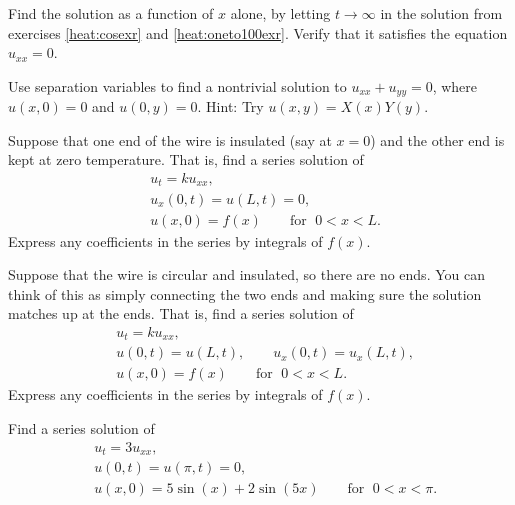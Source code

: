 \documentclass[12pt]{book}
\begin{document}
\begin{exercise}
Find the \emph{} solution as a function
of $x$ alone,
by letting $t \to
\infty$ in the solution from
exercises \ref{heat:cosexr} and \ref{heat:oneto100exr}.
Verify that it satisfies the equation $u_{xx} = 0$.
\end{exercise}

\begin{exercise}
Use separation variables to find a nontrivial
solution to $u_{xx} + u_{yy} = 0$, where $u(x,0) = 0$ and $u(0,y) = 0$.
Hint: Try $u(x,y) = X(x)Y(y)$.
\end{exercise}

\begin{exercise}[challenging]
Suppose that one end of the wire is insulated (say at $x=0$) and
the other end is kept at zero temperature.  That is,
find a series solution of
\begin{align*}
& u_t = k u_{xx} , \\
& u_x(0,t) = u(L,t) = 0 , \\
& u(x,0) = f(x) \qquad \text{for } \; 0 < x < L .
\end{align*}
Express any coefficients in the series by integrals of $f(x)$.
\end{exercise}

\begin{exercise}[challenging]
Suppose that the wire is circular and insulated, so there are no ends. 
You can think of this as simply connecting the two ends and 
making sure the solution matches up at the ends.
That is, find a series solution of
\begin{align*}
& u_t = k u_{xx} , \\
& u(0,t) = u(L,t) , \qquad
u_x(0,t) = u_x(L,t) , \\
& u(x,0) = f(x) \qquad \text{for } \; 0 < x < L .
\end{align*}
Express any coefficients in the series by integrals of $f(x)$.
\end{exercise}

\setcounter{exercise}{100}


\begin{exercise}
Find a series solution of
\begin{align*}
& u_t =  3 u_{xx} , \\
& u(0,t) = u(\pi,t) = 0 , \\
& u(x,0) = 5\sin (x) + 2\sin (5x) \qquad \text{for } \; 0 < x < \pi .
\end{align*}
\end{exercise}
\end{document}

